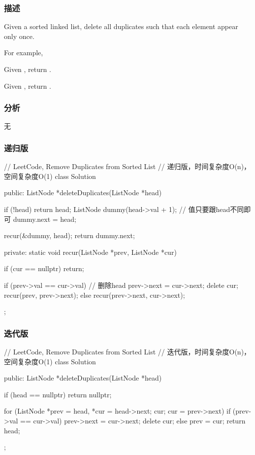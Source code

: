 \subsubsection{描述}
Given a sorted linked list, delete all duplicates such that each element appear only once.

For example,

Given , return .

Given , return .


\subsubsection{分析}
无


\subsubsection{递归版}
\begin{Code}
// LeetCode, Remove Duplicates from Sorted List
// 递归版，时间复杂度O(n)，空间复杂度O(1)
class Solution {
public:
    ListNode *deleteDuplicates(ListNode *head) {
        if (!head) return head;
        ListNode dummy(head->val + 1); // 值只要跟head不同即可
        dummy.next = head;

        recur(&dummy, head);
        return dummy.next;
    }
private:
    static void recur(ListNode *prev, ListNode *cur) {
        if (cur == nullptr) return;

        if (prev->val == cur->val) { // 删除head
            prev->next = cur->next;
            delete cur;
            recur(prev, prev->next);
        } else {
            recur(prev->next, cur->next);
        }
    }
};
\end{Code}


\subsubsection{迭代版}
\begin{Code}
// LeetCode, Remove Duplicates from Sorted List
// 迭代版，时间复杂度O(n)，空间复杂度O(1)
class Solution {
public:
    ListNode *deleteDuplicates(ListNode *head) {
        if (head == nullptr) return nullptr;

        for (ListNode *prev = head, *cur = head->next; cur; cur = prev->next) {
            if (prev->val == cur->val) {
                prev->next = cur->next;
                delete cur;
            } else {
                prev = cur;
            }
        }
        return head;
    }
};
\end{Code}


